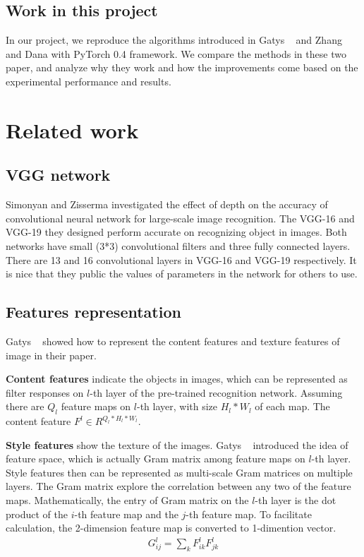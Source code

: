\documentclass[10pt,twocolumn,letterpaper]{article}
\begin{document}
\subsection{Work in this project}

In our project, we reproduce the algorithms introduced in Gatys \etal~\cite{Authors01} and Zhang and Dana \cite{Authors04} with PyTorch 0.4 framework. We compare the methods in these two paper, and analyze why they work and how the improvements come based on the experimental performance and results.


\section{Related work}

\subsection{VGG network}
Simonyan and Zisserma \cite{Authors05} investigated the effect of depth on the accuracy of convolutional neural network for large-scale image recognition. The VGG-16 and VGG-19 they designed perform accurate on recognizing object in images. Both networks have small (3*3) convolutional filters and three fully connected layers. There are 13 and 16 convolutional layers in VGG-16 and VGG-19 respectively. It is nice that they public the values of parameters in the network for others to use. 

\subsection{Features representation}
Gatys \etal~\cite{Authors01} showed how to represent the content features and texture features of image in their paper. 

\textbf{Content features} indicate the objects in images, which can be represented as filter responses on $l$-th layer of the pre-trained recognition network. Assuming there are $Q_l$ feature maps on $l$-th layer, with size $H_l*W_l$ of each map. The content feature $F^l\in R^{Q_l*H_l*W_l}$. 

\textbf{Style features} show the texture of the images. Gatys \etal~\cite{Authors06} introduced the idea of feature space, which is actually Gram matrix among feature maps on $l$-th layer. Style features then can be represented as multi-scale Gram matrices on multiple layers. The Gram matrix explore the correlation between any two of the feature maps. Mathematically, the entry of Gram matrix on the $l$-th layer is the dot product of the $i$-th feature map and the $j$-th feature map. To facilitate calculation, the 2-dimension feature map is converted to 1-dimention vector.
\begin{align}
    G_{ij}^l= \sum_{k}{F_{ik}^l}{F_{jk}^l}
\end{align}
\end{document}
